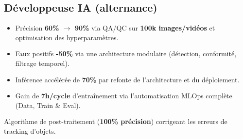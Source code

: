 \documentclass{assets/template/cvclass}
\def\spaceSections{0.13cm}
\begin{document}
\begin{area-right}
    \subsection{Développeuse IA (alternance)}
      \begin{leftarrowbox}
        \begin{itemize}
          \item Précision \textbf{60\% $\to$ 90\%} via QA/QC sur \textbf{100k images/vidéos} et optimisation des hyperparamètres.
          \item Faux positifs \textbf{-50\%} via une architecture modulaire (détection, conformité, filtrage temporel).
          \item Inférence accélérée de \textbf{70\%} par refonte de l'architecture et du déploiement.
          \item Gain de \textbf{7h/cycle} d'entraînement via l'automatisation MLOps complète (Data, Train \& Eval).
        \end{itemize}
      \end{leftarrowbox}
      \vspace{\spaceSections}
      
      \begin{dendleftarrowbox}
        Algorithme de post-traitement (\textbf{100\% précision}) corrigeant les erreurs de tracking d'objets.
      \end{dendleftarrowbox}\\




        
\end{area-right}
\searchbar
\end{document}
